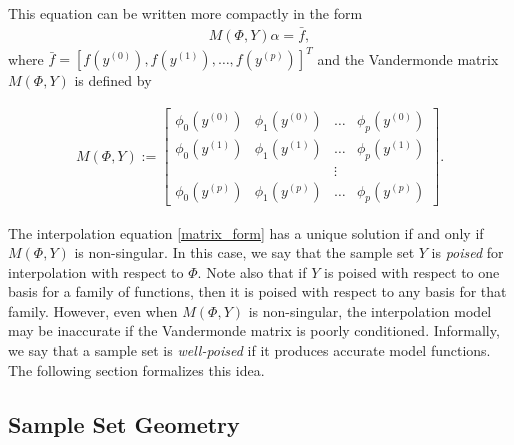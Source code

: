 \documentclass{article}
\begin{document}
This equation can be written more compactly in the form
\begin{align}
\label{matrix_form}
M(\Phi,Y) \alpha = \bar{f},
\end{align}
where $\bar{f} = [f\left(y^{(0)}\right), f\left(y^{(1)}\right), \ldots, f\left(y^{(p)}\right)]^T$ and the Vandermonde matrix $M\left(\Phi,Y\right)$ is defined by

\begin{align}
\label{vandermonde}
M\left(\Phi,Y\right) :=
\begin{bmatrix}
    \phi_0\left(y^{(0)}\right)      & \phi_1\left(y^{(0)}\right)       & \ldots & \phi_{p}\left(y^{(0)}\right)      \\
    \phi_0\left(y^{(1)}\right)      & \phi_1\left(y^{(1)}\right)       & \dots  & \phi_{p}\left(y^{(1)}\right)      \\
                     &                   & \vdots &                    \\
    \phi_0\left(y^{(p)}\right)    & \phi_1\left(y^{(p)}\right)     & \ldots & \phi_{p}\left(y^{{(p)}}\right)
\end{bmatrix}.
\end{align}

The interpolation equation \cref{matrix_form} has a unique solution if and only if $M\left(\Phi,Y\right)$ is non-singular.
In this case, we say that the sample set $Y$ is \emph{poised} for interpolation with respect to $\Phi$.   Note also that if $Y$ is poised with respect to one basis for a family of functions, then it is poised with respect to any basis for that family.     
However, even when $M\left(\Phi,Y\right)$ is non-singular,  the interpolation model may be inaccurate if the Vandermonde matrix is poorly conditioned.   Informally,  we say that a sample set is {\em well-poised} if it produces accurate model functions.  The following section formalizes this idea.

\subsection{Sample Set Geometry}
\end{document}
